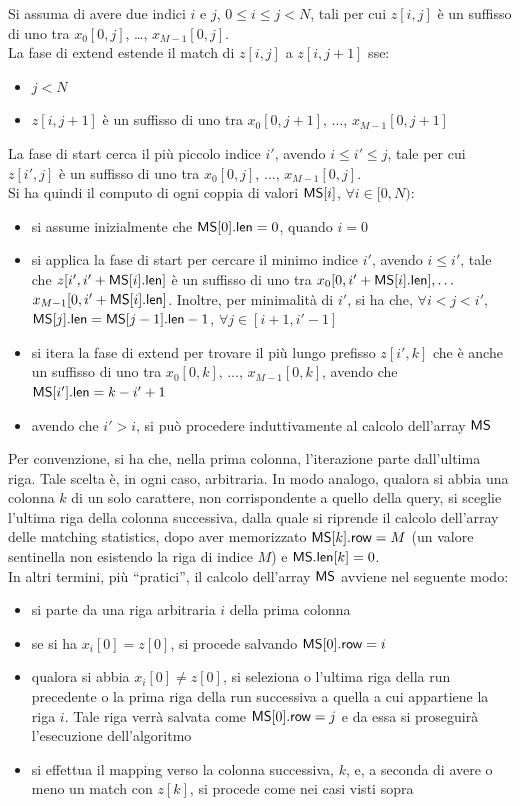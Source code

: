 Si assuma di avere due indici $i$ e $j$, $0\leq i\leq j< N$, tali per cui
$z[i,j]$ è un suffisso di uno tra $x_0[0,j]$, \ldots, $x_{M-1}[0,j]$. \\
La fase di extend estende il match di $z[i,j]$ a $z[i,j+1]$ sse:
\begin{itemize}
  \item $j<N$
  \item $z[i,j+1]$ è un suffisso di uno tra $x_0[0,j+1]$, $\ldots$,
  $x_{M-1}[0,j+1]$ 
\end{itemize}
La fase di start cerca il più piccolo indice $i'$,
avendo $i\leq i'\leq j$, tale per cui $z[i',j]$ è un suffisso di uno tra
$x_0[0,j]$, $\ldots$, $x_{M-1}[0,j]$.\\
Si ha quindi il computo di ogni coppia di valori $\mbox{\rm {\sf MS}}[i]$, $\forall i\in[0,N)$:
\begin{itemize}
  \item si assume inizialmente che $\mbox{\rm {\sf MS}}[0].\mbox{\rm {\sf len}}=0$, quando $i=0$
  \item si applica la fase di start per cercare il minimo indice
  $i'$, avendo $i\leq i'$, tale che $z[i',i'+\mbox{\rm {\sf MS}}[i].\mbox{\rm {\sf len}}]$ è un suffisso di uno
  tra $x_0[0,i'+\mbox{\rm {\sf MS}}[i].\mbox{\rm {\sf len}}], \ldots$ $x_{M-1}[0,i'+\mbox{\rm {\sf MS}}[i].\mbox{\rm {\sf len}}]$. Inoltre, per
  minimalità di $i'$, si ha che, $\forall i<j<i'$,
  $\mbox{\rm {\sf MS}}[j].\mbox{\rm {\sf len}}=\mbox{\rm {\sf MS}}[j-1].\mbox{\rm {\sf len}}-1$, $\forall j\in[i+1,i'-1]$
  \item si itera la fase di extend per trovare il
  più lungo prefisso $z[i',k]$ che è anche un suffisso di uno tra $x_0[0,k]$,
  $\ldots$, $x_{M-1}[0,k]$, avendo che $\mbox{\rm {\sf MS}}[i'].\mbox{\rm {\sf len}}=k-i'+1$
  \item avendo che $i'>i$, si può procedere induttivamente al calcolo dell'array
  $\mbox{\rm {\sf MS}}$ 
\end{itemize}
Per convenzione, si ha che, nella prima colonna, l'iterazione parte dall'ultima
riga. Tale scelta è, in ogni caso, arbitraria. 
In modo
analogo, qualora si abbia una colonna $k$ di un solo carattere, non
corrispondente a quello della query, si sceglie l'ultima riga della
colonna successiva, dalla quale si riprende il calcolo  
dell'array delle matching statistics, dopo aver memorizzato $\mbox{\rm {\sf MS}}[k].\mbox{\rm {\sf row}}=M$
(un valore sentinella non esistendo la riga di indice $M$) e $\mbox{\rm {\sf MS}}.\mbox{\rm {\sf len}}[k]=0$.\\
In altri termini, più ``pratici'', il calcolo dell'array $\mbox{\rm {\sf MS}}$ avviene nel
seguente modo:
\begin{itemize}
  \item si parte da una riga arbitraria $i$ della prima colonna
  \item se si ha $x_i[0]=z[0]$, si procede salvando $\mbox{\rm {\sf MS}}[0].\mbox{\rm {\sf row}}=i$
  \item qualora si abbia $x_i[0]\neq z[0]$, si seleziona o l'ultima riga della
  run precedente o la prima riga della run successiva a quella a cui appartiene
  la riga $i$. Tale riga verrà salvata come $\mbox{\rm {\sf MS}}[0].\mbox{\rm {\sf row}}=j$ e da essa si
  proseguirà l'esecuzione dell'algoritmo
  \item si effettua il mapping verso la colonna successiva, $k$,
  e, a seconda di avere o meno un match con $z[k]$, si procede come nei casi
  visti sopra 
\end{itemize}
